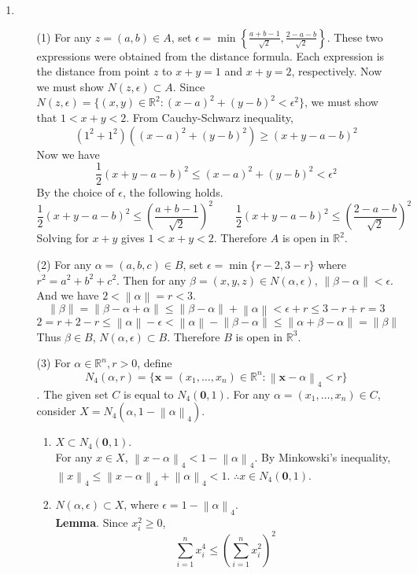 \documentclass[12pt]{report}
\newcommand{\numl}[1]{\item[\large\textbf{\sffamily #1.}]}
\newcommand{\bb}[1]{\mathbb{#1}}
\newcommand{\rmbf}[1]{\mathrm{\mathbf{#1}}}
\newcommand{\norm}[1]{\left\lVert#1\right\rVert}
\newcommand{\ds}{\displaystyle}
\begin{document}
\begin{enumerate}
\numl{7}
\begin{enumerate}
	\item[(1)] For any $z = (a, b)\in A$, set $\epsilon = \min\left\{\ds \frac{a+b-1}{\sqrt{2}}, \frac{2-a-b}{\sqrt{2}} \right\}$. These two expressions were obtained from the distance formula. Each expression is the distance from point $z$ to $x+y=1$ and $x+y=2$, respectively. Now we must show $N(z, \epsilon) \subset A$. Since $N(z, \epsilon) = \{(x, y)\in \bb{R}^2: (x - a)^2 + (y - b)^2 < \epsilon^2 \}$, we must show that $1<x+y<2$. From Cauchy-Schwarz inequality, $$(1^2+1^2)\left( (x-a)^2+(y-b)^2\right)\geq (x+y-a-b)^2 $$
	Now we have $$\frac{1}{2}(x+y-a-b)^2\leq (x-a)^2+(y-b)^2 < \epsilon ^2 $$
	By the choice of $\epsilon$, the following holds. $$\frac{1}{2}(x+y-a-b)^2\leq \left(\frac{a+b-1}{\sqrt{2}}\right)^2 \qquad \frac{1}{2}(x+y-a-b)^2\leq \left(\frac{2-a-b}{\sqrt{2}}\right)^2$$
	Solving for $x+y$ gives $1<x+y<2$. Therefore $A$ is open in $\bb{R}^2$.
	\item[(2)] For any $\alpha = (a, b, c)\in B$, set $\epsilon = \min\{r-2, 3-r \}$ where $r^2 = a^2+b^2+c^2$. Then for any $\beta = (x, y, z) \in N(\alpha, \epsilon)$, $\norm{\beta - \alpha} < \epsilon$. And we have $2 < \norm{\alpha} = r <3 $. $$\norm{\beta} = \norm{\beta - \alpha + \alpha}\leq \norm{\beta - \alpha} +\norm{\alpha} < \epsilon + r \leq 3-r + r = 3$$
	$$2 = r + 2-r \leq \norm{\alpha} - \epsilon < \norm{\alpha} -\norm{\beta-\alpha} \leq \norm{\alpha + \beta - \alpha} = \norm{\beta}$$ 
	Thus $\beta \in B$, $N(\alpha, \epsilon) \subset B$. Therefore $B$ is open in $\bb{R}^3$.
	\item[(3)] For $\alpha \in \bb{R}^n, r>0$, define $$N_4\left(\alpha, r\right) = \{ \rmbf{x} = (x_1, \dots, x_n)\in \bb{R}^n : \norm{\rmbf{x} - \alpha}_4 < r  \}$$.  The given set $C$ is equal to $N_4(\rmbf{0}, 1)$. For any $\alpha = (x_1, \dots, x_n) \in C$, consider $X = N_4\left(\alpha,  {1-\norm{\alpha}_4}\right)$.
	\begin{enumerate}
		\item $X\subset N_4(\rmbf{0}, 1)$.\\
		For any $x\in X$, $\norm{x - \alpha}_4 < 1-\norm{\alpha}_4$. By Minkowski's inequality, $\norm{x}_4\leq \norm{x-\alpha}_4 + \norm{\alpha}_4 < 1$. $\therefore x\in N_4(\rmbf{0}, 1)$.
		\item $N(\alpha, \epsilon) \subset X$, where $\epsilon = 1-\norm{\alpha}_4$.\\\textbf{Lemma}. Since $x_i^2\geq 0$, $$\sum_{i=1}^nx_i^4 \leq \left(\sum_{i=1}^{n}x_i^2\right)^2$$\\

\end{enumerate}
\end{enumerate}
\end{enumerate}
\end{document}
